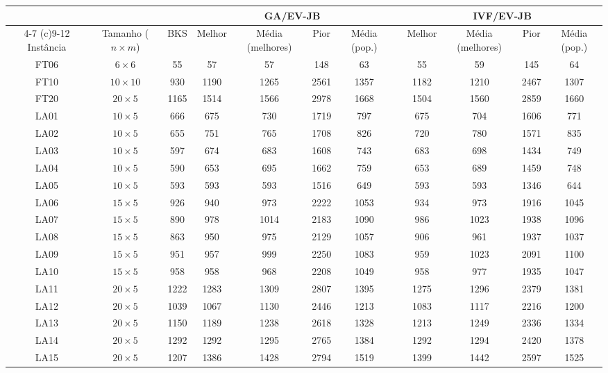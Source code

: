\begin{sidewaystable}
\caption{Resultados do caso de experimento 12}
\centering
\label{experimento12}
\begin{tabular}{cccccccccccc}
\toprule
& & & \multicolumn{4}{c}{GA/EV-JB} & & \multicolumn{4}{c}{IVF/EV-JB} \\
\cmidrule(c){4-7}
\cmidrule(c){9-12}
Inst\^{a}ncia & Tamanho ($n \times m$) & BKS & Melhor & M\'{e}dia (melhores) & Pior & M\'{e}dia (pop.) & & Melhor & M\'{e}dia (melhores) & Pior & M\'{e}dia (pop.) \\
\midrule
FT06 & $6 \times 6$ & 55 & 57 & 57 & 148 & 63 & & 55 & 59 & 145 & 64 \\
FT10 & $10 \times 10$ & 930 & 1190 & 1265 & 2561 & 1357 & & 1182 & 1210 & 2467 & 1307 \\
FT20 & $20 \times 5$ & 1165 & 1514 & 1566 & 2978 & 1668 & & 1504 & 1560 & 2859 & 1660 \\
LA01 & $10 \times 5$ & 666 & 675 & 730 & 1719 & 797 & & 675 & 704 & 1606 & 771 \\
LA02 & $10 \times 5$ & 655 & 751 & 765 & 1708 & 826 & & 720 & 780 & 1571 & 835 \\
LA03 & $10 \times 5$ & 597 & 674 & 683 & 1608 & 743 & & 683 & 698 & 1434 & 749 \\
LA04 & $10 \times 5$ & 590 & 653 & 695 & 1662 & 759 & & 653 & 689 & 1459 & 748 \\
LA05 & $10 \times 5$ & 593 & 593 & 593 & 1516 & 649 & & 593 & 593 & 1346 & 644 \\
LA06 & $15 \times 5$ & 926 & 940 & 973 & 2222 & 1053 & & 934 & 973 & 1916 & 1045 \\
LA07 & $15 \times 5$ & 890 & 978 & 1014 & 2183 & 1090 & & 986 & 1023 & 1938 & 1096 \\
LA08 & $15 \times 5$ & 863 & 950 & 975 & 2129 & 1057 & & 906 & 961 & 1937 & 1037 \\
LA09 & $15 \times 5$ & 951 & 957 & 999 & 2250 & 1083 & & 959 & 1023 & 2091 & 1100 \\
LA10 & $15 \times 5$ & 958 & 958 & 968 & 2208 & 1049 & & 958 & 977 & 1935 & 1047 \\
LA11 & $20 \times 5$ & 1222 & 1283 & 1309 & 2807 & 1395 & & 1275 & 1296 & 2379 & 1381 \\
LA12 & $20 \times 5$ & 1039 & 1067 & 1130 & 2446 & 1213 & & 1083 & 1117 & 2216 & 1200 \\
LA13 & $20 \times 5$ & 1150 & 1189 & 1238 & 2618 & 1328 & & 1213 & 1249 & 2336 & 1334 \\
LA14 & $20 \times 5$ & 1292 & 1292 & 1295 & 2765 & 1384 & & 1292 & 1294 & 2420 & 1378 \\
LA15 & $20 \times 5$ & 1207 & 1386 & 1428 & 2794 & 1519 & & 1399 & 1442 & 2597 & 1525 \\
\bottomrule
\end{tabular}
\end{sidewaystable}
